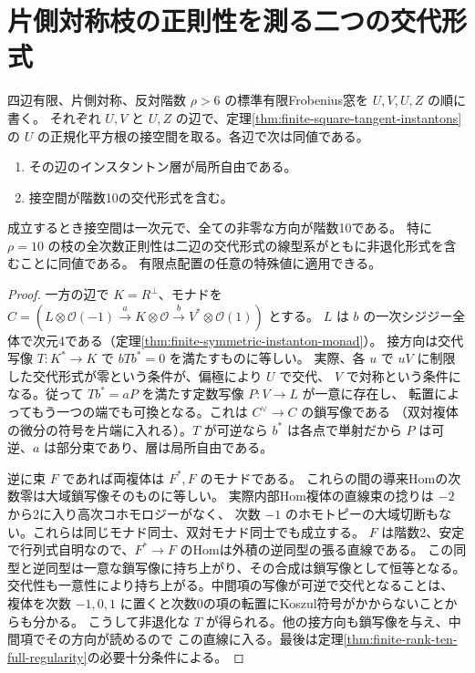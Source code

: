 \section{片側対称枝の正則性を測る二つの交代形式}
\label{sec:single-edge-instanton-extension}
\begin{theorem}\label{thm:single-edge-instanton-extension}
四辺有限、片側対称、反対階数 $\rho>6$ の標準有限Frobenius窓を $U,V,U,Z$ の順に書く。
それぞれ $U,V$ と $U,Z$ の辺で、定理\ref{thm:finite-square-tangent-instantons}の
$U$ の正規化平方根の接空間を取る。各辺で次は同値である。
\begin{enumerate}
\item その辺のインスタントン層が局所自由である。
\item 接空間が階数10の交代形式を含む。
\end{enumerate}
成立するとき接空間は一次元で、全ての非零な方向が階数10である。
特に $\rho=10$ の枝の全次数正則性は二辺の交代形式の線型系がともに非退化形式を含むことに同値である。
有限点配置の任意の特殊値に適用できる。
\end{theorem}
\begin{proof}
一方の辺で $K=R^\perp$、モナドを $C=(L\otimes\mathcal O(-1)\xrightarrow{a}K\otimes\mathcal O
\xrightarrow{b}V^*\otimes\mathcal O(1))$ とする。
$L$ は $b$ の一次シジジー全体で次元4である（定理\ref{thm:finite-symmetric-instanton-monad}）。
接方向は交代写像 $T:K^*\to K$ で $b T b^*=0$ を満たすものに等しい。
実際、各 $u$ で $uV$ に制限した交代形式が零という条件が、偏極により $U$ で交代、
$V$ で対称という条件になる。従って $T b^*=aP$ を満たす定数写像 $P:V\to L$ が一意に存在し、
転置によってもう一つの端でも可換となる。これは $C^\vee\to C$ の鎖写像である
（双対複体の微分の符号を片端に入れる）。$T$ が可逆なら
$b^*$ は各点で単射だから $P$ は可逆、$a$ は部分束であり、層は局所自由である。

逆に束 $F$ であれば両複体は $F^*,F$ のモナドである。
これらの間の導来Homの次数零は大域鎖写像そのものに等しい。
実際内部Hom複体の直線束の捻りは $-2$ から2に入り高次コホモロジーがなく、
次数 $-1$ のホモトピーの大域切断もない。これらは同じモナド同士、双対モナド同士でも成立する。
$F$ は階数2、安定で行列式自明なので、$F^*\to F$ のHomは外積の逆同型の張る直線である。
この同型と逆同型は一意な鎖写像に持ち上がり、その合成は鎖写像として恒等となる。
交代性も一意性により持ち上がる。中間項の写像が可逆で交代となることは、
複体を次数 $-1,0,1$ に置くと次数0の項の転置にKoszul符号がかからないことからも分かる。
こうして非退化な $T$ が得られる。他の接方向も鎖写像を与え、中間項でその方向が読めるので
この直線に入る。最後は定理\ref{thm:finite-rank-ten-full-regularity}の必要十分条件による。
\end{proof}


